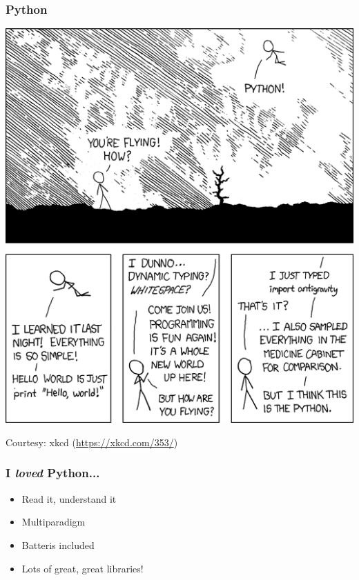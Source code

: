 \documentclass[aspectratio=169]{beamer}
\begin{document}
\begin{frame}
    \frametitle{Python}
    \centering
    \includegraphics[scale=0.3]{images/xkcd-python.png}

    {\small Courtesy: xkcd (\url{https://xkcd.com/353/})}
\end{frame}

\begin{frame}
    \frametitle{I \textit{loved} Python...}
    \begin{itemize}
        \item Read it, understand it
        \item Multiparadigm
        \item Batteris included
        \item Lots of great, great libraries!
    \end{itemize}
\end{frame}
\end{document}
